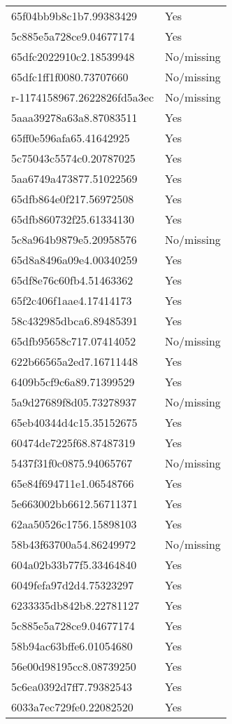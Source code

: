 \begin{tabular}{ll}
65f04bb9b8c1b7.99383429 & Yes \\
5c885e5a728ce9.04677174 & Yes \\
65dfc2022910c2.18539948 & No/missing \\
65dfc1ff1f0080.73707660 & No/missing \\
r-1174158967.2622826fd5a3ec & No/missing \\
5aaa39278a63a8.87083511 & Yes \\
65ff0e596afa65.41642925 & Yes \\
5c75043c5574c0.20787025 & Yes \\
5aa6749a473877.51022569 & Yes \\
65dfb864e0f217.56972508 & Yes \\
65dfb860732f25.61334130 & Yes \\
5c8a964b9879e5.20958576 & No/missing \\
65d8a8496a09e4.00340259 & Yes \\
65df8e76c60fb4.51463362 & Yes \\
65f2c406f1aae4.17414173 & Yes \\
58c432985dbca6.89485391 & Yes \\
65dfb95658c717.07414052 & No/missing \\
622b66565a2ed7.16711448 & Yes \\
6409b5cf9c6a89.71399529 & Yes \\
5a9d27689f8d05.73278937 & No/missing \\
65eb40344d4c15.35152675 & Yes \\
60474de7225f68.87487319 & Yes \\
5437f31f0c0875.94065767 & No/missing \\
65e84f694711e1.06548766 & Yes \\
5e663002bb6612.56711371 & Yes \\
62aa50526c1756.15898103 & Yes \\
58b43f63700a54.86249972 & No/missing \\
604a02b33b77f5.33464840 & Yes \\
6049fefa97d2d4.75323297 & Yes \\
6233335db842b8.22781127 & Yes \\
5c885e5a728ce9.04677174 & Yes \\
58b94ac63bffe6.01054680 & Yes \\
56e00d98195cc8.08739250 & Yes \\
5c6ea0392d7ff7.79382543 & Yes \\
6033a7ec729fe0.22082520 & Yes \\

\end{tabular}
